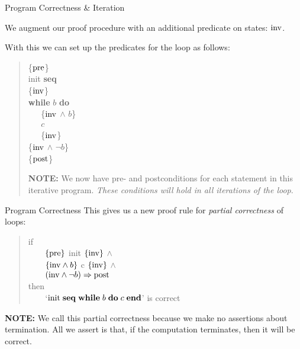 \documentclass{beamer}
\begin{document}
\begin{frame}[fragile]{Program Correctness \& Iteration}

We augment our proof procedure with an additional predicate on states: $\rm inv$.

\vspace{.1in}

With this we can set up the predicates for the loop as follows:
\begin{quote}
\begin{minipage}{1.5in}
\{$\rm pre$\}\\
{\rm init} {\bf seq}\\
\{$\rm inv$\}  \\                                  
{\bf while} $b$ {\bf do}  \\                       
{\tt\verb"   "}\{$\rm inv$ $\wedge$ $b$\}  \\
{\tt\verb"   "}$c$    \\
{\tt\verb"   "}\{$\rm inv$\}  \\                            
\{$\rm inv$ $\wedge$ $\neg b$\}\\
\{$\rm post$\}  
\end{minipage}
\begin{minipage}{2in}
{\bf NOTE: } We now have pre- and postconditions for each statement in this iterative
program. {\em These conditions will hold in all iterations of the loop}.
\end{minipage}
\end{quote}                          
\end{frame}


\begin{frame}[fragile]{Program Correctness}
This gives us a new proof rule for {\em partial correctness} of loops:
\begin{quote}
if\\
{\verb"    "}$\{\rm pre\}$ {\rm init} $\{\rm inv\}$ $\wedge$\\
{\verb"    "}$\{{\rm inv} \wedge b\}$ c $\{\rm inv\}$ $\wedge$\\
{\verb"    "}$({\rm inv} \wedge \neg b) \Rightarrow {\rm post}$\\
then\\
{\verb"    "}`${\rm init}\; {\bf seq}\; {\bf while}\; {b}\;{\bf do}\;{c}\; \mbox{\bf end}$' is correct\\
\end{quote}

{\bf NOTE: } We call this partial correctness because we make no assertions about termination.
All we assert is that, if the computation terminates, then it will be correct.

\end{frame}
\end{document}
